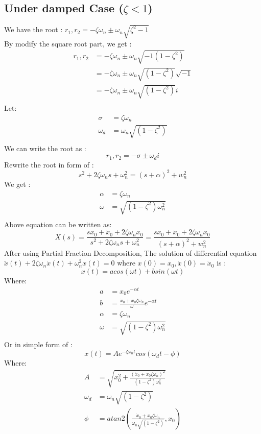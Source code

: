 \subsection{Under damped Case ($ \zeta < 1$)}
We have the root : $ r_1,r_2 = -\zeta\omega_n \pm \omega_n\sqrt{\zeta^2-1} $\\
By modify the square root part, we get :
\[
\begin{split}
	r_1,r_2 &= -\zeta\omega_n \pm \omega_n\sqrt{-1(1-\zeta^2)} \\
	&= -\zeta\omega_n \pm \omega_n\sqrt{(1-\zeta^2)}\sqrt{-1} \\
	&= -\zeta\omega_n \pm \omega_n\sqrt{(1-\zeta^2)}i \\
\end{split}
\]
Let:
\[
\begin{split}
	\sigma &= \zeta\omega_n\\
	\omega_d &=\omega_n\sqrt{(1-\zeta^2)} \\
\end{split}
\]
We can write the root as :
\[
r_1,r_2 = -\sigma \pm \omega_d i
\]
Rewrite the root in form of :
\[
s^2 + 2\zeta\omega_ns+\omega_n^2 = (s+\alpha)^2+w_n^2
\]
We get :
\[
\begin{split}
	\alpha &= \zeta\omega_n\\
	\omega &= \sqrt{(1-\zeta^2)\omega_n^2} \\
\end{split}
\]
Above equation can be written as:
\[ 
X(s) = \frac{sx_0 + \dot{x}_0 + 2\zeta\omega_nx_0}{s^2 + 2\zeta\omega_ns+\omega_n^2} = \frac{sx_0 + \dot{x}_0 + 2\zeta\omega_nx_0}{(s+\alpha)^2+w_n^2}
\]
After using Partial Fraction Decomposition, The solution of differential equation $ \ddot{x}(t)+2\zeta\omega_n\dot{x}(t)+\omega_n^2x(t)=0  $ where $ x(0)=x_0, \dot{x}(0) = \dot{x}_0 $ is :
\[
x(t) = a cos(\omega t) + b sin(\omega t)
\]
Where:
\[
\begin{split}
	a &= x_0e^{-\alpha t}\\
	b &= \frac{\dot{x}_0 + x_0\zeta\omega_n}{\omega} e^{-\alpha t}\\
	\alpha &= \zeta\omega_n \\
	\omega &= \sqrt{(1-\zeta^2)\omega_n^2} \\
\end{split} 
\]
Or in simple form of :
\[
x(t) = A e^{-\zeta \omega_n t}cos(\omega_d t - \phi)
\]
Where:
\[
\begin{split}
	A &= \sqrt{x_0^2 + \frac{(\dot{x}_0 + x_0\zeta\omega_n)^2}{(1-\zeta^2)\omega_n^2}}\\
	\omega_d &= \omega_n\sqrt{(1-\zeta^2)} \\
	\phi & = atan2(\frac{\dot{x}_0 + x_0\zeta\omega_n}{\omega_n\sqrt{(1-\zeta^2)}},x_0)
\end{split} 
\]